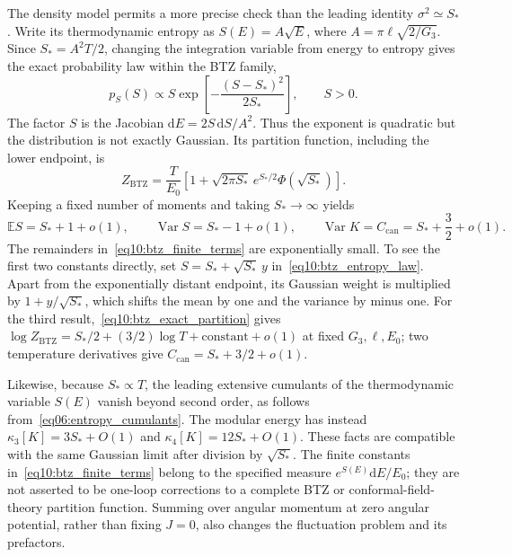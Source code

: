 \documentclass[11pt,letterpaper]{article}
\newcommand{\E}{\mathbb{E}}
\DeclareMathOperator{\Var}{Var}
\newcommand{\dd}{\mathrm{d}}
\theoremstyle{plain}
\theoremstyle{definition}
\theoremstyle{remark}
\begin{document}
The density model permits a more precise check than the leading identity $\sigma^2\simeq S_*$. Write its thermodynamic entropy as $S(E)=A\sqrt E$, where $A=\pi\ell\sqrt{2/G_3}$. Since $S_*=A^2T/2$, changing the integration variable from energy to entropy gives the exact probability law within the BTZ family,
\begin{equation}
 p_S(S)\propto S\exp\!\left[-\frac{(S-S_*)^2}{2S_*}\right],
 \qquad S>0.
 \label{eq10:btz_entropy_law}
\end{equation}
The factor $S$ is the Jacobian $\dd E=2S\,\dd S/A^2$. Thus the exponent is quadratic but the distribution is not exactly Gaussian. Its partition function, including the lower endpoint, is
\begin{equation}
 Z_{\mathrm{BTZ}}=\frac{T}{E_0}
 \left[1+\sqrt{2\pi S_*}\,e^{S_*/2}\Phi(\sqrt{S_*})\right].
 \label{eq10:btz_exact_partition}
\end{equation}
Keeping a fixed number of moments and taking $S_*\to\infty$ yields
\begin{equation}
 \E S=S_*+1+o(1),\qquad
 \Var S=S_*-1+o(1),\qquad
 \Var K=C_{\mathrm{can}}=S_*+\frac32+o(1).
 \label{eq10:btz_finite_terms}
\end{equation}
The remainders in~\eqref{eq10:btz_finite_terms} are exponentially small. To see the first two constants directly, set $S=S_*+\sqrt{S_*}\,y$ in~\eqref{eq10:btz_entropy_law}. Apart from the exponentially distant endpoint, its Gaussian weight is multiplied by $1+y/\sqrt{S_*}$, which shifts the mean by one and the variance by minus one. For the third result,~\eqref{eq10:btz_exact_partition} gives $\log Z_{\mathrm{BTZ}}=S_*/2+(3/2)\log T+\text{constant}+o(1)$ at fixed $G_3,\ell,E_0$; two temperature derivatives give $C_{\mathrm{can}}=S_*+3/2+o(1)$.

Likewise, because $S_*\propto T$, the leading extensive cumulants of the thermodynamic variable $S(E)$ vanish beyond second order, as follows from~\eqref{eq06:entropy_cumulants}. The modular energy has instead $\kappa_3[K]=3S_*+O(1)$ and $\kappa_4[K]=12S_*+O(1)$. These facts are compatible with the same Gaussian limit after division by $\sqrt{S_*}$. The finite constants in~\eqref{eq10:btz_finite_terms} belong to the specified measure $e^{S(E)}\dd E/E_0$; they are not asserted to be one-loop corrections to a complete BTZ or conformal-field-theory partition function. Summing over angular momentum at zero angular potential, rather than fixing $J=0$, also changes the fluctuation problem and its prefactors.
\end{document}
